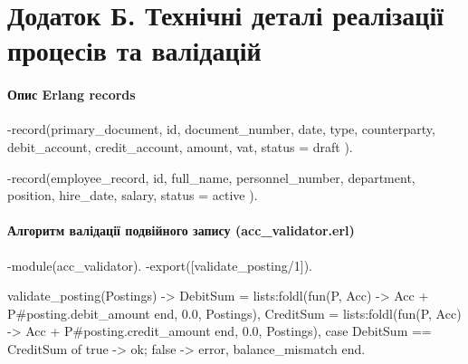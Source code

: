 \documentclass{article}
\let\originalfootnotesize\footnotesize
\let\oldverbatim\verbatim
\let\oldendverbatim\endverbatim
\renewenvironment{verbatim}{\originalfootnotesize\oldverbatim}{\oldendverbatim}
\begin{document}
\section{Додаток Б. Технічні деталі реалізації процесів та валідацій}

\paragraph{Опис Erlang records}
\begin{verbatim}
-record(primary_document, {
    id, document_number, date, type, counterparty,
    debit_account, credit_account, amount, vat, status = draft
}).

-record(employee_record, {
    id, full_name, personnel_number, department, position,
    hire_date, salary, status = active
}).
\end{verbatim}

\paragraph{Алгоритм валідації подвійного запису (acc\_validator.erl)}
\begin{verbatim}
-module(acc_validator).
-export([validate_posting/1]).

validate_posting(Postings) ->
    DebitSum = lists:foldl(fun(P, Acc) -> Acc + P#posting.debit_amount end, 0.0, Postings),
    CreditSum = lists:foldl(fun(P, Acc) -> Acc + P#posting.credit_amount end, 0.0, Postings),
    case DebitSum == CreditSum of
        true -> ok;
        false -> {error, balance_mismatch}
    end.
\end{verbatim}
\end{document}
